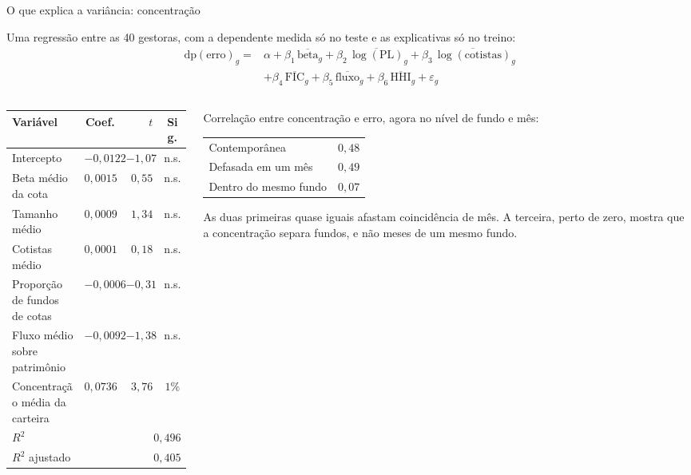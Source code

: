 \documentclass[aspectratio=169,11pt]{beamer}
\begin{document}
\begin{frame}{O que explica a variância: concentração}

Uma regressão entre as 40 gestoras, com a dependente medida só no teste e as explicativas só
no treino:
\begin{align*}
\text{dp}(\text{erro})_g = {}& \alpha + \beta_1\,\overline{\text{beta}}_g
 + \beta_2\,\overline{\log(\text{PL})}_g + \beta_3\,\overline{\log(\text{cotistas})}_g \\[-0.15em]
 & + \beta_4\,\overline{\text{FIC}}_g + \beta_5\,\overline{\text{fluxo}}_g
 + \beta_6\,\overline{\text{HHI}}_g + \varepsilon_g
\end{align*}

\vspace{-0.4em}

\begin{columns}[T]
\begin{column}{0.55\textwidth}
\scriptsize
\begin{tabular}{@{}lrrc@{}}
\toprule
Variável & Coef. & $t$ & Sig. \\
\midrule
Intercepto & $-0{,}0122$ & $-1{,}07$ & n.s. \\
Beta médio da cota & $0{,}0015$ & $0{,}55$ & n.s. \\
Tamanho médio & $0{,}0009$ & $1{,}34$ & n.s. \\
Cotistas médio & $0{,}0001$ & $0{,}18$ & n.s. \\
Proporção de fundos de cotas & $-0{,}0006$ & $-0{,}31$ & n.s. \\
Fluxo médio sobre patrimônio & $-0{,}0092$ & $-1{,}38$ & n.s. \\
Concentração média da carteira & $0{,}0736$ & $3{,}76$ & $1\%$ \\
\midrule
$R^2$ & \multicolumn{3}{r}{$0{,}496$} \\
$R^2$ ajustado & \multicolumn{3}{r}{$0{,}405$} \\
\bottomrule
\end{tabular}
\end{column}

\begin{column}{0.43\textwidth}
\small
Correlação entre concentração e erro, agora no nível de fundo e mês:

\vspace{0.4em}
\centering
\begin{tabular}{@{}lr@{}}
\toprule
Contemporânea & $0{,}48$ \\
Defasada em um mês & $0{,}49$ \\
Dentro do mesmo fundo & $0{,}07$ \\
\bottomrule
\end{tabular}

\vspace{0.6em}
\raggedright
As duas primeiras quase iguais afastam coincidência de mês. A terceira, perto de zero, mostra
que a concentração separa fundos, e não meses de um mesmo fundo.
\end{column}
\end{columns}

\end{frame}
\end{document}
